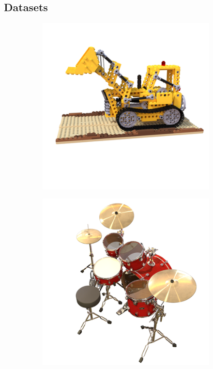 \documentclass{article}
\begin{document}
\subsection{Datasets}

\begin{figure}[!h]
 \centering

\begin{subfigure}{.24\textwidth}
  \centering
  \includegraphics[width=\linewidth]{figs/results/lego_ref.png}  
\end{subfigure}
\begin{subfigure}{.24\textwidth}
  \centering
  \includegraphics[width=\linewidth]{figs/results/drums_ref.png}  

\end{subfigure}
\end{figure}
\end{document}
